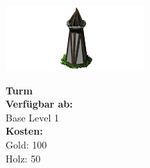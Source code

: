 \documentclass{scrartcl}
\begin{document}
\begin{minipage}{0.3\textwidth}
	\includegraphics[width=\textwidth]{imgSmallTower.png}
\end{minipage}
\hfill
\begin{minipage}{0.5\textwidth}
	\textbf{Turm}\\

	\textbf{Verfügbar ab: }\\ Base Level 1\\
	\textbf{Kosten:
	}\\
	Gold: 100 \\
	Holz: 50\\
	
\end{minipage}
\end{document}
